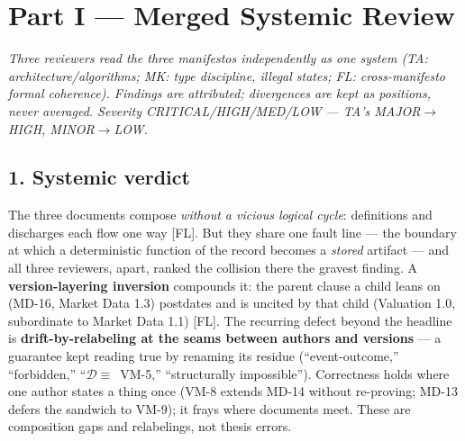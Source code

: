 
\section*{Part I --- Merged Systemic Review}

\noindent\emph{Three reviewers read the three manifestos independently as one system (TA:
architecture/algorithms; MK: type discipline, illegal states; FL: cross-manifesto formal
coherence). Findings are attributed; divergences are kept as positions, never averaged.
Severity CRITICAL/HIGH/MED/LOW --- TA's MAJOR$\to$HIGH, MINOR$\to$LOW.}

\subsection*{1. Systemic verdict}

The three documents compose \emph{without a vicious logical cycle}: definitions and discharges
each flow one way [FL]. But they share one fault line --- the boundary at which a deterministic
function of the record becomes a \emph{stored} artifact --- and all three reviewers, apart,
ranked the collision there the gravest finding. A \textbf{version-layering inversion} compounds
it: the parent clause a child leans on (MD-16, Market Data 1.3) postdates and is uncited by that
child (Valuation 1.0, subordinate to Market Data 1.1) [FL]. The recurring defect beyond the
headline is \textbf{drift-by-relabeling at the seams between authors and versions} --- a
guarantee kept reading true by renaming its residue (``event-outcome,'' ``forbidden,''
``$\mathcal{D}\equiv$~VM-5,'' ``structurally impossible''). Correctness holds where one author
states a thing once (VM-8 extends MD-14 without re-proving; MD-13 defers the sandwich to VM-9);
it frays where documents meet. These are composition gaps and relabelings, not thesis errors.

